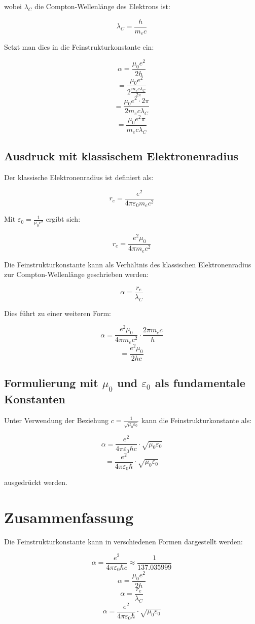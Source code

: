 \documentclass{article}
\begin{document}
	wobei $\lambda_C$ die Compton-Wellenlänge des Elektrons ist:
	
	$$\lambda_C = \frac{h}{m_e c}$$
	
	Setzt man dies in die Feinstrukturkonstante ein:
	
	$$\alpha = \frac{\mu_0e^2}{2h}$$
	$$= \frac{\mu_0e^2}{2\frac{m_e c \lambda_C}{2\pi}}$$
	$$= \frac{\mu_0e^2 \cdot 2\pi}{2m_e c \lambda_C}$$
	$$= \frac{\mu_0e^2\pi}{m_e c \lambda_C}$$
	
	\subsection{Ausdruck mit klassischem Elektronenradius}
	Der klassische Elektronenradius ist definiert als:
	
	$$r_e = \frac{e^2}{4\pi\varepsilon_0 m_e c^2}$$
	
	Mit $\varepsilon_0 = \frac{1}{\mu_0c^2}$ ergibt sich:
	
	$$r_e = \frac{e^2\mu_0}{4\pi m_e c^2}$$
	
	Die Feinstrukturkonstante kann als Verhältnis des klassischen Elektronenradius zur Compton-Wellenlänge geschrieben werden:
	
	$$\alpha = \frac{r_e}{\lambda_C}$$
	
	Dies führt zu einer weiteren Form:
	
	$$\alpha = \frac{e^2\mu_0}{4\pi m_e c^2} \cdot \frac{2\pi m_e c}{h}$$
	$$= \frac{e^2\mu_0}{2hc}$$
	
	\subsection{Formulierung mit $\mu_0$ und $\varepsilon_0$ als fundamentale Konstanten}
	Unter Verwendung der Beziehung $c = \frac{1}{\sqrt{\mu_0\varepsilon_0}}$ kann die Feinstrukturkonstante als:
	
	$$\alpha = \frac{e^2}{4\pi\varepsilon_0\hbar c} \cdot \sqrt{\mu_0\varepsilon_0}$$
	$$= \frac{e^2}{4\pi\varepsilon_0\hbar} \cdot \sqrt{\mu_0\varepsilon_0}$$
	
	ausgedrückt werden.
	
	\section{Zusammenfassung}
	Die Feinstrukturkonstante kann in verschiedenen Formen dargestellt werden:
	
	$$\alpha = \frac{e^2}{4\pi\varepsilon_0\hbar c} \approx \frac{1}{137.035999}$$
	$$\alpha = \frac{\mu_0e^2}{2h}$$
	$$\alpha = \frac{r_e}{\lambda_C}$$
	$$\alpha = \frac{e^2}{4\pi\varepsilon_0\hbar} \cdot \sqrt{\mu_0\varepsilon_0}$$
	
\end{document}
